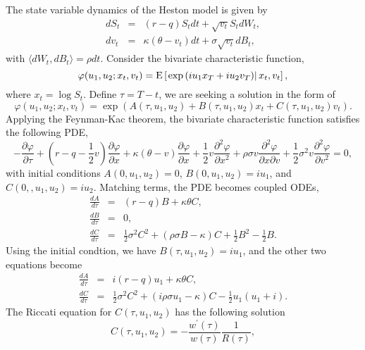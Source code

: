 \documentclass[12pt]{article}
\begin{document}
    The state variable dynamics of the Heston model is given by
    \begin{eqnarray}
      dS_t &=& (r-q)S_tdt+\sqrt{v_t}S_tdW_t, \\
      dv_t &=& \kappa(\theta - v_t)dt + \sigma\sqrt{v_t}dB_t,
    \end{eqnarray}
    with $\langle dW_t,dB_t\rangle=\rho dt$. Consider the bivariate characteristic function,
    \begin{equation}
      \varphi(u_1,u_2; x_t, v_t)={\rm E}\left[\left.\exp\left(iu_1x_T+iu_2v_T\right)\right|x_t,v_t\right],
    \end{equation}
    where $x_t=\log S_t$. Define $\tau = T-t$, we are seeking a solution in the form of
    \begin{equation}
      \varphi(u_1,u_2; x_t, v_t) = \exp\left(A(\tau,u_1,u_2)+B(\tau,u_1,u_2)x_t+C(\tau,u_1,u_2)v_t\right).
    \end{equation}
    Applying the Feynman-Kac theorem, the bivariate characteristic function satisfies the following PDE,
    \begin{equation}
      -\frac{\partial \varphi}{\partial \tau} + \left(r-q-\frac{1}{2}v\right)\frac{\partial \varphi}{\partial x}
      + \kappa(\theta - v)\frac{\partial \varphi}{\partial x} + \frac{1}{2}v\frac{\partial^2 \varphi}{\partial x^2}
      + \rho\sigma v\frac{\partial^2 \varphi}{\partial x\partial v}+\frac{1}{2}\sigma^2v\frac{\partial^2 \varphi}{\partial v^2}=0,
    \end{equation}
    with initial conditions $A(0,u_1,u_2)=0$, $B(0,u_1,u_2)=iu_1$, and $C(0,,u_1,u_2)=iu_2$. Matching terms, the
    PDE becomes coupled ODEs,
    \begin{eqnarray}
      \frac{dA}{d\tau} &=& (r-q)B+\kappa\theta C, \\
      \frac{dB}{d\tau} &=& 0, \\
      \frac{dC}{d\tau} &=& \frac{1}{2}\sigma^2C^2+(\rho\sigma B-\kappa)C+\frac{1}{2}B^2-\frac{1}{2}B.
    \end{eqnarray}
    Using the initial condtion, we have $B(\tau,u_1,u_2)=iu_1$, and the other two equations become
    \begin{eqnarray}
      \frac{dA}{d\tau} &=& i(r-q)u_1+\kappa\theta C, \label{A} \\
      \frac{dC}{d\tau} &=& \frac{1}{2}\sigma^2C^2+(i\rho\sigma u_1-\kappa)C-\frac{1}{2}u_1(u_1+i).
      \label{C}
    \end{eqnarray}
    The Riccati equation for $C(\tau,u_1,u_2)$ has the following solution
    \begin{equation}
      C(\tau,u_1,u_2)=-\frac{w^{\prime}(\tau)}{w(\tau)}\frac{1}{R(\tau)},
    \end{equation}
\end{document}
